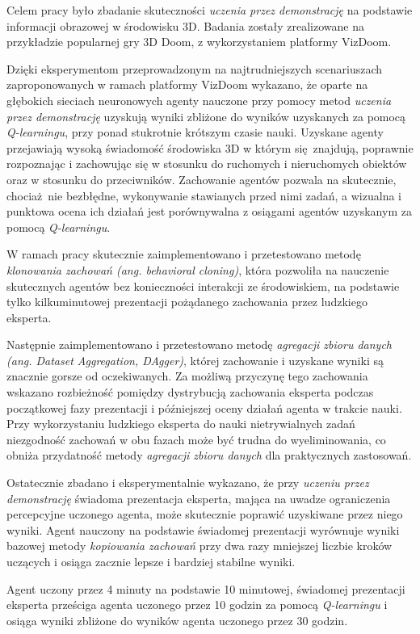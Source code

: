 \documentclass[polish,master,a4paper,oneside]{ppfcmthesis}
\begin{document}
Celem pracy było zbadanie skuteczności \textit{uczenia przez demonstrację} na podstawie informacji obrazowej w środowisku 3D. Badania zostały zrealizowane na przykładzie popularnej gry 3D Doom, z wykorzystaniem platformy VizDoom.

Dzięki eksperymentom przeprowadzonym na najtrudniejszych scenariuszach zaproponowanych w ramach platformy VizDoom wykazano, że oparte na głębokich sieciach neuronowych agenty nauczone przy pomocy metod \textit{uczenia przez demonstrację} uzyskują wyniki zbliżone do wyników uzyskanych za pomocą \textit{Q-learningu}, przy ponad stukrotnie krótszym czasie nauki. Uzyskane agenty przejawiają wysoką świadomość środowiska 3D w którym się znajdują, poprawnie rozpoznając i zachowując się w stosunku do ruchomych i nieruchomych obiektów oraz w stosunku do przeciwników. Zachowanie agentów pozwala na skutecznie, chociaż nie bezbłędne, wykonywanie stawianych przed nimi zadań, a wizualna i punktowa ocena ich działań jest porównywalna z osiągami agentów uzyskanym za pomocą \textit{Q-learningu}.

W ramach pracy skutecznie zaimplementowano i przetestowano metodę \textit{klonowania zachowań (ang. behavioral cloning)}, która pozwoliła na nauczenie skutecznych agentów bez konieczności interakcji ze środowiskiem, na podstawie tylko kilkuminutowej prezentacji pożądanego zachowania przez ludzkiego eksperta.

Następnie zaimplementowano i przetestowano metodę \textit{agregacji zbioru danych (ang. Dataset Aggregation, DAgger)}, której zachowanie i uzyskane wyniki są znacznie gorsze od oczekiwanych. Za możliwą przyczynę tego zachowania wskazano rozbieżność pomiędzy dystrybucją zachowania eksperta podczas początkowej fazy prezentacji i późniejszej oceny działań agenta w trakcie nauki. Przy wykorzystaniu ludzkiego eksperta do nauki nietrywialnych zadań niezgodność zachowań w obu fazach może być trudna do wyeliminowania, co obniża przydatność metody \textit{agregacji zbioru danych} dla praktycznych zastosowań.

Ostatecznie zbadano i eksperymentalnie wykazano, że przy \textit{uczeniu przez demonstrację} świadoma prezentacja eksperta, mająca na uwadze ograniczenia percepcyjne uczonego agenta, może skutecznie poprawić uzyskiwane przez niego wyniki. Agent nauczony na podstawie świadomej prezentacji wyrównuje wyniki bazowej metody \textit{kopiowania zachowań} przy dwa razy mniejszej liczbie kroków uczących i osiąga zacznie lepsze i bardziej stabilne wyniki.

Agent uczony przez 4 minuty na podstawie 10 minutowej, świadomej prezentacji eksperta prześciga agenta uczonego przez 10 godzin za pomocą \textit{Q-learningu} i osiąga wyniki zbliżone do wyników agenta uczonego przez 30 godzin.
\end{document}
